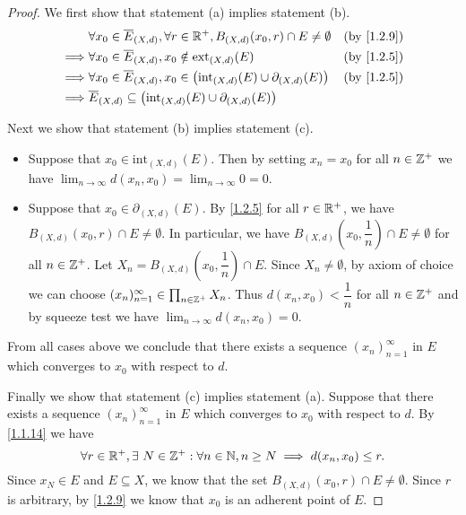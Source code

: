 \begin{proof}
  We first show that statement (a) implies statement (b).
  \begin{align*}
             & \forall x_0 \in \overline{E}_{(X, d)}, \forall r \in \R^+, B_{(X, d)}(x_0, r) \cap E \neq \emptyset       &  & \text{(by \cref{1.2.9})} \\
    \implies & \forall x_0 \in \overline{E}_{(X, d)}, x_0 \notin \text{ext}_{(X, d)}(E)                                  &  & \text{(by \cref{1.2.5})} \\
    \implies & \forall x_0 \in \overline{E}_{(X, d)}, x_0 \in \big(\text{int}_{(X, d)}(E) \cup \partial_{(X, d)}(E)\big) &  & \text{(by \cref{1.2.5})} \\
    \implies & \overline{E}_{(X, d)} \subseteq \big(\text{int}_{(X, d)}(E) \cup \partial_{(X, d)}(E)\big)
  \end{align*}

  Next we show that statement (b) implies statement (c).
  \begin{itemize}
    \item Suppose that \(x_0 \in \text{int}_{(X, d)}(E)\).
          Then by setting \(x_n = x_0\) for all \(n \in \mathbb{Z}^+\) we have \(\lim_{n \to \infty} d(x_n, x_0) = \lim_{n \to \infty} 0 = 0\).
    \item Suppose that \(x_0 \in \partial_{(X, d)}(E)\).
          By \cref{1.2.5} for all \(r \in \mathbb{R}^+\), we have \(B_{(X, d)}(x_0, r) \cap E \neq \emptyset\).
          In particular, we have \(B_{(X, d)}(x_0, \dfrac{1}{n}) \cap E \neq \emptyset\) for all \(n \in \mathbb{Z}^+\).
          Let \(X_n = B_{(X, d)}(x_0, \dfrac{1}{n}) \cap E\).
          Since \(X_n \neq \emptyset\), by axiom of choice we can choose \((x_n)_{n = 1}^\infty \in \prod_{n \in \mathbb{Z}^+} X_n\).
          Thus \(d(x_n, x_0) < \dfrac{1}{n}\) for all \(n \in \mathbb{Z}^+\) and by squeeze test we have \(\lim_{n \to \infty} d(x_n, x_0) = 0\).
  \end{itemize}
  From all cases above we conclude that there exists a sequence \((x_n)_{n = 1}^\infty\) in \(E\) which converges to \(x_0\) with respect to \(d\).

  Finally we show that statement (c) implies statement (a).
  Suppose that there exists a sequence \((x_n)_{n = 1}^\infty\) in \(E\) which converges to \(x_0\) with respect to \(d\).
  By \cref{1.1.14} we have
  \[
    \forall r \in \mathbb{R}^+, \exists\ N \in \mathbb{Z}^+ : \forall n \in \mathbb{N}, n \geq N \implies d(x_n, x_0) \leq r.
  \]
  Since \(x_N \in E\) and \(E \subseteq X\), we know that the set \(B_{(X, d)}(x_0, r) \cap E \neq \emptyset\).
  Since \(r\) is arbitrary, by \cref{1.2.9} we know that \(x_0\) is an adherent point of \(E\).
\end{proof}

